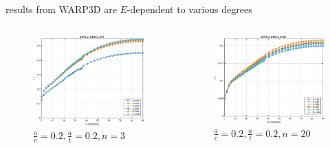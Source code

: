 \begin{frame}
\hone results from WARP3D are \(E\)-dependent to various degrees
\begin{columns}
\begin{column}{0.45\columnwidth}
\begin{figure}[tbp]
\centering
\includegraphics[width=0.9\columnwidth]{h1_warp_ac02_at02_n03}
\caption{\(\frac{a}{c}=0.2, \frac{a}{t}=0.2, n=3\)}
\end{figure}
\end{column}
\begin{column}{0.45\columnwidth}
\begin{figure}[tbp]
\centering
\includegraphics[width=0.9\columnwidth]{h1_warp_ac02_at02_n20}
\caption{\(\frac{a}{c}=0.2, \frac{a}{t}=0.2, n=20\)}
\end{figure}
\end{column}
\end{columns}
\end{frame}

